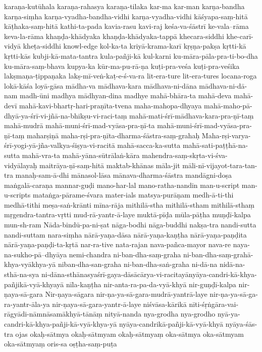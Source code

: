 {karaṇa-kutūhala
karaṇa-rahasya
karaṇa-tilaka
kar-ma
kar-man
karṇa-bandha
karṇa-siṃha
karṇa-vyadha-bandha-vidhi
karṇa-vyadha-vidhi
kāśyapa-saṃ-hitā
kāṭhaka-saṃ-hitā
kathi-ta-pada
kavia-rasu
kavi-raj
keśa-va-śāstrī
ke-vala--rāma
keva-la-rāma
khaṇḍa-khādyaka
khaṇḍa-khādyaka-tappā
khecara-siddhi
khe-carī-vidyā
kheṭa-siddhi
knowl-edge
kol-ka-ta
kriyā-krama-karī
kṛṣṇa-pakṣa
kṛtti-kā
kṛtti-kās
kubji-kā-mata-tantra
kula-pañji-kā
kul-karni
ku-māra-pāla-pra-ti-bo-dha
ku-māra-saṃ-bhava
kupya-ka
kūr-ma-pu-rā-ṇa
kuṭi-pra-veśa
kuṭi-pra-veśika
lakṣmaṇa-ṭippaṇaka
lakṣ-mī-veṅ-kaṭ-e-ś-va-ra
lit-era-ture
lit-era-tures
locana-roga
lokā-kāśa
loyā-gāsa
mādha-va
mādhava-kara
mādhava-ni-dāna
mādhava-ni-dā-nam
madh-ūni
madhya
mādhyan-dina
madhye
mahā-bhāra-ta
mahā-deva
mahā-devī
mahā-kavi-bhartṛ-hari-praṇīta-tvena
maha-mahopa-dhyaya
mahā-maho-pā-dhyā-ya-śrī-vi-jñā-na-bhikṣu-vi-raci-taṃ
mahā-mati-śrī-mādhava-kara-pra-ṇī-taṃ
mahā-mudrā
mahā-muni-śrī-mad-vyāsa-pra-ṇī-ta
mahā-muni-śrī-mad-vyāsa-pra-ṇī-taṃ
maharṣiṇā
maha-rṣi-pra-ṇīta-dharma-śāstra-saṃ-grahaḥ
Maha-rṣi-varya-śrī-yogi-yā-jña-valkya-śiṣya-vi-racitā
mahā-sacca-ka-sutta
mahā-sati-paṭṭhā-na-sutta
mahā-vra-ta
mahā-yāna-sūtrālaṅ-kāra
mahendra-saṃ-skṛta-vi-śva-vidyālayaḥ
maitrāya-ṇī-saṃ-hitā
maktab-khānas
māla-jit
māli-nī-vijayot-tara-tan-tra
manaḥ-sam-ā-dhi
mānasol-lāsa
mānava-dharma-śāstra
mandāgni-doṣa
maṅgalā-caraṇa
mannar-guḍi
mano-har-lal
mano-ratha-nandin
man-u-script
man-u-scripts
mataṅga-pārame-śvara
mater-ials
matsya-purāṇam
medh-ā-ti-thi
medhā-tithi
meṣa-saṅ-krānti
mīna-rāja
mithilā-stha
mithilā-stham
mithilā-sthaṃ
mṛgendra-tantra-vṛtti
mud-rā-yantr-ā-laye
muktā-pīḍa
mūla-pāṭha
muṇḍī-kalpa
mun-sh-ram
Nāda-bindū-pa-ni-ṣat
nāga-bodhi
nāga-buddhi
nakṣa-tra
nandi-sutta
nandi-suttam
nara-siṃha
nārā-yaṇa-dāsa
nārā-yaṇa-kaṇṭha
nārā-yaṇa-paṇḍita
nārā-yaṇa-paṇḍi-ta-kṛtā
nar-ra-tive
nata-rajan
nava-pañca-mayor
nava-re
naya-na-sukho-pā--dhyāya
nemi-chandra
ni-ban-dha-saṃ-graha
ni-ban-dha-saṃ-grahā-khya-vyākhya-yā
niban-dha-san-graha
ni-ban-dha-saṅ-graha
ni-dā-na
nidā-na-sthā-na-sya
ni-dāna-sthānasyaśrī-gaya-dāsācārya-vi-racitayānyāya-candri-kā-khya-pañjikā-vyā-khyayā
nīla-kaṇṭha
nir-anta-ra-pa-da-vyā-khyā
nir-guṇḍī-kalpa
nir-ṇaya-sā-gara
Nir-ṇaya-sāgara
nir-ṇa-ya-sā-gara-mudrā-yantrā-laye
nir-ṇa-ya-sā-ga-ra-yantr-āla-ya
nir-ṇaya-sā-gara-yantr-ā-laye
niśvāsa-kārikā
nīti-śṛṅgāra-vai-rāgyādi-nāmnāsamākhyā-tānāṃ
nityā-nanda
nya-grodha
nya-grodho
nyā-ya-candri-kā-khya-pañji-kā-vyā-khya-yā
nyāya-candrikā-pañji-kā-vyā-khyā
nyāya-śās-tra
ojas
okaḥ-sātmya
okaḥ-sātmyam
okaḥ-sātmyaṃ
oka-sātmya
oka-sātmyam
oka-sātmyaṃ
oris-sa
oṣṭha-saṃ-puṭa
}
